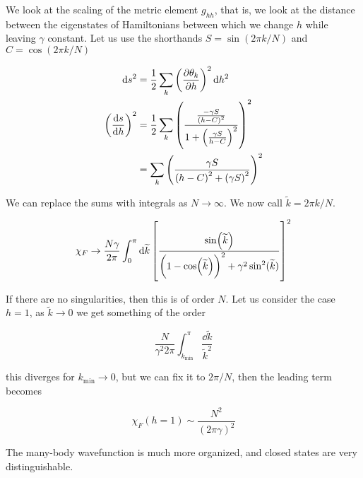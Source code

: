 \documentclass[main_zanardi.tex]{subfiles}
\begin{document}
We look at the scaling of the metric element \(g _{hh} \), that is, we look at the distance between the eigenstates of Hamiltonians between which we change \(h\) while leaving \(\gamma\) constant. Let us use the shorthands \(S = \sin(2 \pi k /N)\) and \(C = \cos(2 \pi k /N)\)

\begin{subequations}
\begin{align}
    \dd{s^2} &= \frac{1}{2} \sum _{k}  \qty(\pdv{\theta_k}{h})^2 \dd{h^2}  \\
    \qty(\dv{s}{h})^2 &= \frac{1}{2} \sum _{k}
    \qty(\frac{\frac{-\gamma S}{\qty(h - C)^2}}{1 + \qty(\frac{\gamma S}{h - C})^2})^2  \\
    &= \sum _{k} \qty( \frac{\gamma S}{\qty(h - C)^2 + \qty(\gamma S)^2})^2
\end{align}
\end{subequations}

We can replace the sums with integrals as \(N \rightarrow \infty\). We now call \(\widetilde{k}=2\pi k / N \).

\begin{equation}
    \chi_F  \rightarrow \frac{N \gamma }{2 \pi} \int _{0}   ^{\pi} \dd{\widetilde{k}}
    \qty[\frac{\sin(\widetilde{k} ) }{\qty(1 - \cos(\widetilde{k} ) )^2 + \gamma^2 \sin^2(\widetilde{k} ) }]^2
\end{equation}

If there are no singularities, then this is of order \(N\). Let us consider the case \(h = 1\),
as \(\widetilde{k} \rightarrow 0\) we get something of the order

\begin{equation}
    \frac{N}{\gamma^2 2 \pi } \int   _{k _{\text{min}}} ^{\pi }  \frac{\dd{\widetilde{k} }}{\widetilde{k}^2 }
\end{equation}

this diverges for \(k _{\text{min}} \rightarrow 0 \), but we can fix it to \(2 \pi / N\), then the leading term becomes

\begin{equation}
    \chi_F (h = 1) \sim \frac{N^2}{(2 \pi \gamma)^2}
\end{equation}

The many-body wavefunction is much more organized, and closed states are very distinguishable.
\end{document}
